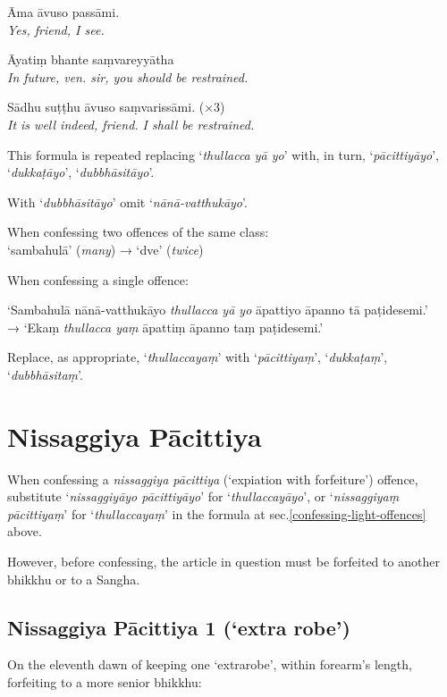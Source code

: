 \hangindent=25pt%
\parbox{22pt}{} Āma āvuso passāmi.\\ \emph{Yes, friend, I see.}

\hangindent=25pt%
\parbox{22pt}{} Āyatiṃ bhante saṃvareyyātha\\ \emph{In future, ven. sir, you should be restrained.}

\hangindent=25pt%
\parbox{22pt}{} Sādhu suṭṭhu āvuso saṃvarissāmi. (×3)\\ \emph{It is well indeed, friend. I shall be restrained.}

This formula is repeated replacing ‘\emph{thullacca yā yo}’ with, in turn, ‘\emph{pācittiyāyo}’,
‘\emph{dukkaṭāyo}’, ‘\emph{dubbhāsitāyo}’.

With ‘\emph{dubbhāsitāyo}’ omit ‘\emph{nānā-vatthukāyo}’.

When confessing two offences of the same class:\\
‘sambahulā’ (\emph{many}) → ‘dve’ (\emph{twice})

When confessing a single offence:

‘Sambahulā nānā-vatthukāyo \emph{thullacca yā yo} āpattiyo āpanno tā paṭidesemi.’\\
→ ‘Ekaṃ \emph{thullacca yaṃ} āpattiṃ āpanno taṃ paṭidesemi.’

Replace, as appropriate, ‘\emph{thullaccayaṃ}’ with ‘\emph{pācittiyaṃ}’, ‘\emph{dukkaṭaṃ}’, ‘\emph{dubbhāsitaṃ}’.

\section{Nissaggiya Pācittiya}

When confessing a \emph{nissaggiya pācittiya} (‘expiation with forfeiture’)
offence, substitute ‘\emph{nissaggiyāyo pācittiyāyo}’ for
‘\emph{thullaccayāyo}’, or ‘\emph{nissaggiyaṃ pācittiyaṃ}’ for
‘\emph{thullaccayaṃ}’ in the formula at sec.\ref{confessing-light-offences}
above.

However, before confessing, the article in question must be forfeited to another
bhikkhu or to a Sangha. 

\subsection{Nissaggiya Pācittiya 1 (‘extra robe’)}
\label{np-1-extra-robe}

On the eleventh dawn of keeping one ‘extrarobe’, within forearm's length,
forfeiting to a more senior bhikkhu:

